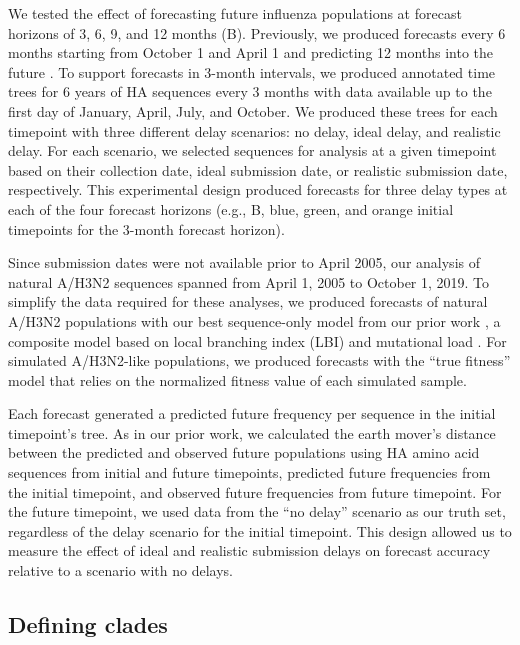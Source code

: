 \documentclass[9pt,lineno]{elife}
\begin{document}
We tested the effect of forecasting future influenza populations at forecast horizons of 3, 6, 9, and 12 months (B).
Previously, we produced forecasts every 6 months starting from October 1 and April 1 and predicting 12 months into the future \citep{Huddleston2020}.
To support forecasts in 3-month intervals, we produced annotated time trees for 6 years of HA sequences every 3 months with data available up to the first day of January, April, July, and October.
We produced these trees for each timepoint with three different delay scenarios: no delay, ideal delay, and realistic delay.
For each scenario, we selected sequences for analysis at a given timepoint based on their collection date, ideal submission date, or realistic submission date, respectively.
This experimental design produced forecasts for three delay types at each of the four forecast horizons (e.g., B, blue, green, and orange initial timepoints for the 3-month forecast horizon).

Since submission dates were not available prior to April 2005, our analysis of natural A/H3N2 sequences spanned from April 1, 2005 to October 1, 2019.
To simplify the data required for these analyses, we produced forecasts of natural A/H3N2 populations with our best sequence-only model from our prior work \citep{Huddleston2020}, a composite model based on local branching index (LBI) \citep{Neher:2014eu} and mutational load \citep{Luksza:2014hj}.
For simulated A/H3N2-like populations, we produced forecasts with the ``true fitness'' model that relies on the normalized fitness value of each simulated sample.

Each forecast generated a predicted future frequency per sequence in the initial timepoint's tree.
As in our prior work, we calculated the earth mover's distance \citep{Rubner1998} between the predicted and observed future populations using HA amino acid sequences from initial and future timepoints, predicted future frequencies from the initial timepoint, and observed future frequencies from future timepoint.
For the future timepoint, we used data from the ``no delay'' scenario as our truth set, regardless of the delay scenario for the initial timepoint.
This design allowed us to measure the effect of ideal and realistic submission delays on forecast accuracy relative to a scenario with no delays.

\subsection{Defining clades}
\end{document}
